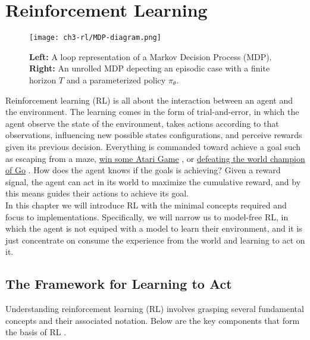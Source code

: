 \chapter{Reinforcement Learning}

\begin{figure}[ht]
    \centering
    \texttt{[image: ch3-rl/MDP-diagram.png]}
    \captionsetup{width=\textwidth} %
    \caption{\textbf{Left:} A loop representation of a Markov Decision Process (MDP). \textbf{Right:} An unrolled MDP depecting an episodic case with a finite horizon $T$ and a parameterized policy $\pi_{\theta}$.}
    \label{fig:mdp-diagram}
  \end{figure}

Reinforcement learning (RL) is all about the interaction between an agent and the environment. The learning comes in the form of trial-and-error, in which the agent observe the state of the environment, takes actions according to that observations, influencing new possible states configurations, and perceive rewards given its previous decision. Everything is commanded toward achieve a goal such as escaping from a maze, \href{https://arxiv.org/abs/1312.5602}{win some Atari Game} \citep{mnih2013playing}, or \href{https://deepmind.google/technologies/alphago/}{defeating the world champion of Go} \citep{silver2016mastering}. How does the agent knows if the goals is achieving? Given a reward signal, the agent can act in its world to maximize the cumulative reward, and by this means guides their actions to achieve its goal. \\

\noindent In this chapter we will introduce RL with the minimal concepts required and focus to implementations. Specifically, we will narrow us to model-free RL, in which the agent is not equiped with a model to learn their 
environment, and it is just concentrate on consume the experience from the world and learning to act on it.


\section{The Framework for Learning to Act}


Understanding reinforcement learning (RL) involves grasping several fundamental concepts and their associated notation. Below are the key components that form the basis of RL \cite{Sutton1998}.

